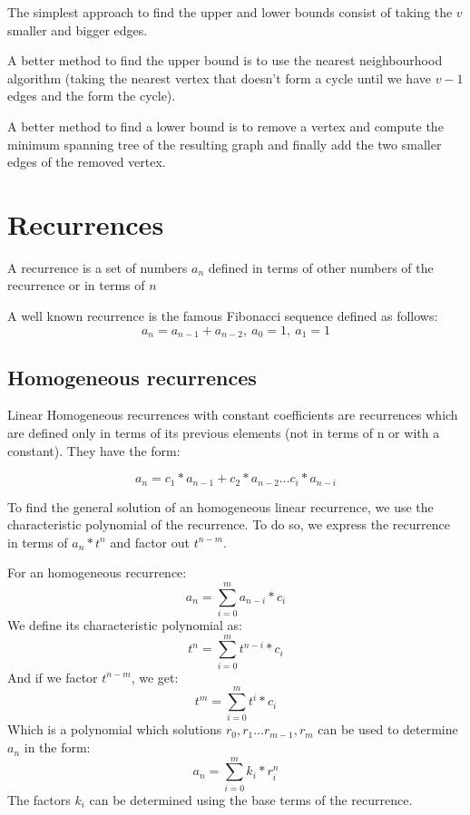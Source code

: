 \documentclass[11pt,twoside]{article}
\theoremstyle{defi}
\begin{document}
The simplest approach to find the upper and lower bounds consist of taking the $v$ smaller and bigger edges.

A better method to find the upper bound is to use the nearest neighbourhood algorithm (taking the nearest vertex that doesn't form a cycle until we have $v-1$ edges and the form the cycle).

A better method to find a lower bound is to remove a vertex and compute the minimum spanning tree of the resulting graph and finally add the two smaller edges of the removed vertex.

\newpage

\section{Recurrences}

\begin{definitionii}
A recurrence is a set of numbers $a_n$ defined in terms of other numbers of the recurrence or in terms of $n$
\end{definitionii}

A well known recurrence is the famous Fibonacci sequence defined as follows:
$$a_n = a_{n-1} + a_{n-2},\ a_0 = 1,\ a_1 = 1$$

\subsection{Homogeneous recurrences}
\begin{definitionii}
Linear Homogeneous recurrences with constant coefficients are recurrences which are defined only in terms of its previous elements (not in terms of n or with a constant). They have the form:

$$ a_n = c_1*a_{n-1} + c_2*a_{n-2} \ldots c_i*a_{n-i}$$

\end{definitionii}

To find the general solution of an homogeneous linear recurrence, we use the characteristic polynomial of the recurrence. To do so, we express the recurrence in terms of $a_n*t^n$ and factor out $t^{n-m}$. 

For an homogeneous recurrence:
$$a_n=\sum_{i=0}^m a_{n-i}*c_i$$
We define its characteristic polynomial as:
$$t^n = \sum_{i=0}^m t^{n-i}*c_i$$
And if we factor $t^{n-m}$, we get:
$$t^m = \sum_{i=0}^m t^{i}*c_i$$
Which is a polynomial which solutions $r_0,r_1 \ldots r_{m-1}, r_m $ can be used to determine $ a_n $ in the form:
$$a_n = \sum_{i=0}^m k_i*r_i^n$$
The factors $k_i$ can be determined using the base terms of the recurrence.
\end{document}
